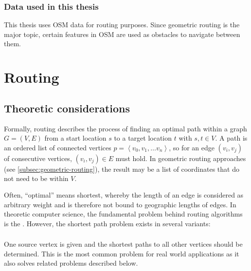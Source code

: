 		\subsubsection{Data used in this thesis}
		
			This thesis uses OSM data for routing purposes.
			Since geometric routing is the major topic, certain features in OSM are used as obstacles to navigate between them.
			

\section{Routing}

	
	\subsection{Theoretic considerations}
	\label{subsec:routing-theoretic-considerations}
	
		Formally, routing describes the process of finding an optimal path within a graph $G=(V, E)$ from a start location $s$ to a target location $t$ with $s, t \in V$.
		A path is an ordered list of connected vertices $p=\left\langle v_0, v_1, \dots v_n \right\rangle$, so for an edge $(v_i, v_j)$ of consecutive vertices, $(v_i, v_j) \in E$ must hold.
		In geometric routing approaches (see \cref{subsec:geometric-routing}), the result may be a list of coordinates that do not need to be within $V$.
		
		Often, \enquote{optimal} means shortest, whereby the length of an edge is considered as arbitrary weight and is therefore not bound to geographic lengths of edges.
		In theoretic computer science, the fundamental problem behind routing algorithms is the .
		However, the shortest path problem exists in several variants\cite[644]{cormen-introduction-to-alg}:
		
		\subsubsection{}
		
			One source vertex is given and the shortest paths to all other vertices should be determined.
			This is the most common problem for real world applications as it also solves related problems described below.
			
